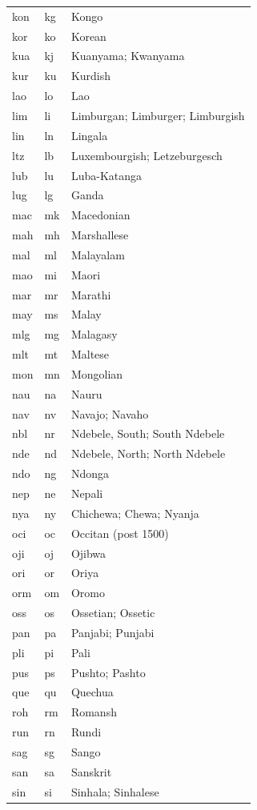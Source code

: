 \documentclass[12pt, twoside]{article}
\begin{document}
\begin{longtable}{|L{3cm}|L{3cm}|L{5cm}|}
kon & kg & Kongo\\
kor & ko & Korean\\
kua & kj & Kuanyama; Kwanyama\\
kur & ku & Kurdish\\
lao & lo & Lao\\
lim & li & Limburgan; Limburger; Limburgish\\
lin & ln & Lingala\\
ltz & lb & Luxembourgish; Letzeburgesch\\
lub & lu & Luba-Katanga\\
lug & lg & Ganda\\
mac & mk & Macedonian\\
mah & mh & Marshallese\\
mal & ml & Malayalam\\
mao & mi & Maori\\
mar & mr & Marathi\\
may & ms & Malay\\
mlg & mg & Malagasy\\
mlt & mt & Maltese\\
mon & mn & Mongolian\\
nau & na & Nauru\\
nav & nv & Navajo; Navaho\\
nbl & nr & Ndebele, South; South Ndebele\\
nde & nd & Ndebele, North; North Ndebele\\
ndo & ng & Ndonga\\
nep & ne & Nepali\\
nya & ny & Chichewa; Chewa; Nyanja\\
oci & oc & Occitan (post 1500)\\
oji & oj & Ojibwa\\
ori & or & Oriya\\
orm & om & Oromo\\
oss & os & Ossetian; Ossetic\\
pan & pa & Panjabi; Punjabi\\
pli & pi & Pali\\
pus & ps & Pushto; Pashto\\
que & qu & Quechua\\
roh & rm & Romansh\\
run & rn & Rundi\\
sag & sg & Sango\\
san & sa & Sanskrit\\
sin & si & Sinhala; Sinhalese\\

\end{longtable}
\end{document}
